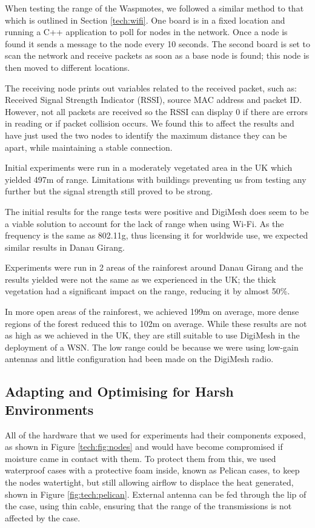 When testing the range of the Waspmotes, we followed a similar method to that which is outlined in Section \ref{tech:wifi}. One board is in a fixed location and running a C++ application to poll for nodes in the network. Once a node is found it sends a message to the node every 10 seconds. The second board is set to scan the network and receive packets as soon as a base node is found; this node is then moved to different locations.
			
The receiving node prints out variables related to the received packet, such as: Received Signal Strength Indicator (RSSI), source MAC address and packet ID. However, not all packets are received so the RSSI can display 0 if there are errors in reading or if packet collision occurs. We found this to affect the results and have just used the two nodes to identify the maximum distance they can be apart, while maintaining a stable connection.
					
Initial experiments were run in a moderately vegetated area in the UK which yielded 497m of range. Limitations with buildings preventing us from testing any further but the signal strength still proved to be strong.
			
The initial results for the range tests were positive and DigiMesh does seem to be a viable solution to account for the lack of range when using Wi-Fi. As the frequency is the same as 802.11g, thus licensing it for worldwide use, we expected similar results in Danau Girang.
						
Experiments were run in 2 areas of the rainforest around Danau Girang and the results yielded were not the same as we experienced in the UK; the thick vegetation had a significant impact on the range, reducing it by almost 50\%.
			
In more open areas of the rainforest, we achieved 199m on average, more dense regions of the forest reduced this to 102m on average. While these results are not as high as we achieved in the UK, they are still suitable to use DigiMesh in the deployment of a WSN. The low range could be because we were using low-gain antennas and little configuration had been made on the DigiMesh radio.

\subsection{Adapting and Optimising for Harsh Environments}
	All of the hardware that we used for experiments had their components exposed, as shown in Figure \ref{tech:fig:nodes} and would have become compromised if moisture came in contact with them. To protect them from this, we used waterproof cases with a protective foam inside, known as Pelican cases, to keep the nodes watertight, but still allowing airflow to displace the heat generated, shown in Figure \ref{fig:tech:pelican}.
	External antenna can be fed through the lip of the case, using thin cable, ensuring that the range of the transmissions is not affected by the case. 

